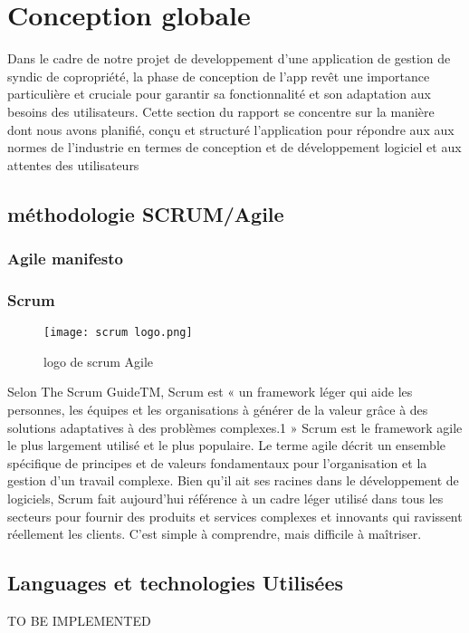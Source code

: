 \section{Conception globale}
Dans le cadre de notre projet de developpement  d'une application de gestion de syndic de copropriété, la phase de conception de l'app revêt une importance particulière et cruciale pour garantir sa fonctionnalité et son adaptation aux besoins des utilisateurs. 
Cette section du rapport se concentre sur la manière dont nous avons planifié, conçu et structuré l'application pour répondre aux aux normes de l'industrie en termes de conception et de développement logiciel et aux attentes des utilisateurs
\subsection{méthodologie SCRUM/Agile}
\subsubsection{Agile manifesto}

\subsubsection{Scrum}
\begin{wrapfigure}{r}{0.25\textwidth} 
    \centering
    \texttt{[image: scrum logo.png]}
    \caption{logo de scrum Agile}
\end{wrapfigure}
Selon The Scrum GuideTM, Scrum est « un framework léger qui aide les personnes, les équipes et les organisations à générer de la valeur grâce à des solutions adaptatives à des problèmes complexes.1 » Scrum est le framework agile le plus largement utilisé et le plus populaire. Le terme agile décrit un ensemble spécifique de principes et de valeurs fondamentaux pour l'organisation et la gestion d'un travail complexe.
Bien qu'il ait ses racines dans le développement de logiciels, Scrum fait aujourd'hui référence à un cadre léger utilisé dans tous les secteurs pour fournir des produits et services complexes et innovants qui ravissent réellement les clients. C'est simple à comprendre, mais difficile à maîtriser.
\cite*{scrumalliance}
\subsection{Languages et technologies Utilisées}
TO BE IMPLEMENTED
